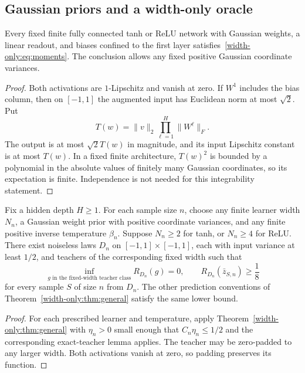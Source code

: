 \subsection{Gaussian priors and a width-only oracle}
\begin{lemma}
Every fixed finite fully connected tanh or ReLU network with Gaussian weights, a linear readout, and biases confined to the first layer satisfies~\eqref{width-only:eq:moments}. The conclusion allows any fixed positive Gaussian coordinate variances.
\end{lemma}
\begin{proof}
Both activations are $1$-Lipschitz and vanish at zero. If $W^1$ includes the bias column, then on $[-1,1]$ the augmented input has Euclidean norm at most $\sqrt2$. Put
\[
 T(w)=\|v\|_2\prod_{\ell=1}^H\|W^\ell\|_F.
\]
The output is at most $\sqrt2 T(w)$ in magnitude, and its input Lipschitz constant is at most $T(w)$. In a fixed finite architecture, $T(w)^2$ is bounded by a polynomial in the absolute values of finitely many Gaussian coordinates, so its expectation is finite. Independence is not needed for this integrability statement.
\end{proof}

\begin{corollary}
\label{width-only:cor:oracle}
Fix a hidden depth $H\ge1$. For each sample size $n$, choose any finite learner width $N_n$, a Gaussian weight prior with positive coordinate variances, and any finite positive inverse temperature $\beta_n$. Suppose $N_n\ge2$ for tanh, or $N_n\ge4$ for ReLU. There exist noiseless laws $D_n$ on $[-1,1]\times[-1,1]$, each with input variance at least $1/2$, and teachers of the corresponding fixed width such that
\[
 \inf_{g\text{ in the fixed-width teacher class}}R_{D_n}(g)=0,
 \qquad
 R_{D_n}(\bar z_{S,n})\ge\frac18
\]
for every sample $S$ of size $n$ from $D_n$. The other prediction conventions of Theorem~\ref{width-only:thm:general} satisfy the same lower bound.
\end{corollary}
\begin{proof}
For each prescribed learner and temperature, apply Theorem~\ref{width-only:thm:general} with $\eta_n>0$ small enough that $C_n\eta_n\le1/2$ and the corresponding exact-teacher lemma applies. The teacher may be zero-padded to any larger width. Both activations vanish at zero, so padding preserves its function.
\end{proof}


